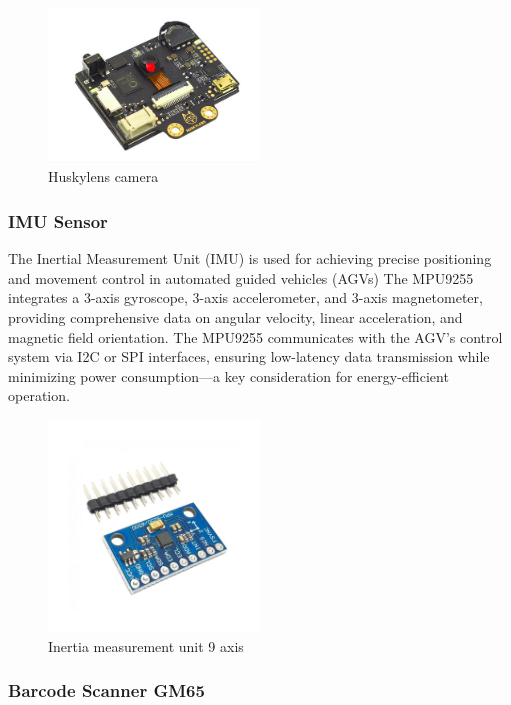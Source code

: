 \documentclass[../../main]{subfiles}
\begin{document}
\begin{figure}[H]
    \centering
    \includegraphics[width=0.5\textwidth]{fig/huskylens.png}
    \caption{ Huskylens camera}
    \label{ Huskylens camera} %
\end{figure}


\subsubsection{IMU Sensor}

The Inertial Measurement Unit (IMU)  is used for achieving precise positioning and movement control in automated guided vehicles (AGVs)
The MPU9255 integrates a 3-axis gyroscope, 3-axis accelerometer, and 3-axis magnetometer, providing comprehensive data on angular velocity, 
linear acceleration, and magnetic field orientation. The MPU9255 communicates with the AGV’s control system via I2C or SPI interfaces, 
ensuring low-latency data transmission while minimizing power consumption—a key consideration for energy-efficient operation.

\begin{figure}[H]
    \centering
    \includegraphics[width=0.5\textwidth]{fig/imu.jpg}
    \caption{ Inertia measurement unit 9 axis}
    \label{IMU} %
\end{figure}

\subsubsection{Barcode Scanner GM65}
\end{document}
